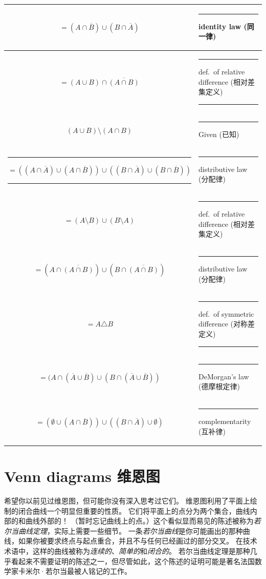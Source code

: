 \begin{tabular}{|c|m{8em}|}\hline
\rule[-16pt]{0pt}{44pt}$= (A \cap \overline{B}) \cup (B \cap \overline{A})$ & \rule{12pt}{0pt} identity law (同一律) \\\hline
\rule[-16pt]{0pt}{44pt}$= (A \cup B) \cap \overline{(A \cap B)}$ & \rule{12pt}{0pt} def.\ of relative difference (相对差集定义) \rule{12pt}{0pt} \\\hline
\rule[-16pt]{0pt}{44pt}$(A \cup B) \setminus (A \cap B)$ & \rule{12pt}{0pt} Given (已知)  \\\hline
\rule[-16pt]{0pt}{44pt}\rule{12pt}{0pt}$= ((A \cap \overline{A}) \cup (A \cap \overline{B})) \cup ((B \cap \overline{A}) \cup (B \cap \overline{B}))$ \rule{12pt}{0pt} & \rule{12pt}{0pt} distributive law (分配律)  \\\hline
\rule[-16pt]{0pt}{44pt}$= (A \setminus B) \cup (B \setminus A)$ & \rule{12pt}{0pt}  def.\ of relative difference (相对差集定义) \\\hline
\rule[-16pt]{0pt}{44pt}$= (A \cap \overline{(A \cap B)}) \cup (B \cap \overline{(A \cap B)})$ & \rule{12pt}{0pt} distributive law (分配律) \\\hline
\rule[-16pt]{0pt}{44pt}$= A \triangle B $ & \rule{12pt}{0pt} def.\ of symmetric difference (对称差定义) \rule{12pt}{0pt}\\\hline
\rule[-16pt]{0pt}{44pt}$= (A \cap (\overline{A} \cup \overline{B}) \cup (B \cap (\overline{A} \cup \overline{B}))$ & \rule{12pt}{0pt} DeMorgan's law (德摩根定律) \\\hline
\rule[-16pt]{0pt}{44pt}$= (\emptyset \cup (A \cap \overline{B})) \cup ((B \cap \overline{A}) \cup \emptyset)$ & \rule{12pt}{0pt} complementarity (互补律) \\\hline
\end{tabular}

\clearpage 




\newpage


\section{Venn diagrams 维恩图}
\label{sec:venn}

希望你以前见过维恩图，但可能你没有深入思考过它们。
维恩图利用了平面上绘制的闭合曲线一个明显但重要的性质。
它们将平面上的点分为两个集合，曲线内部的和曲线外部的！
（暂时忘记曲线上的点。）这个看似显而易见的陈述被称为\emph{若尔当曲线定理}，实际上需要一些细节。
一条\emph{若尔当曲线}是你可能画出的那种曲线，如果你被要求终点与起点重合，并且不与任何已经画过的部分交叉。
在技术术语中，这样的曲线被称为\emph{连续的}、\emph{简单的}和\emph{闭合的}。
若尔当曲线定理是那种几乎看起来不需要证明的陈述之一，但尽管如此，这个陈述的证明可能是著名法国数学家卡米尔·若尔当最被人铭记的工作。

